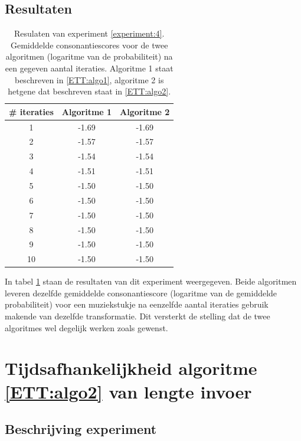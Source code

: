 \subsection{Resultaten}

\begin{table}
  \centering
  \begin{tabular}{c | c | c }    
    \# iteraties & Algoritme 1 & Algoritme 2 \\
    \hline
    1 & -1.69 & -1.69\\
    2 & -1.57 & -1.57\\
    3 & -1.54 & -1.54\\
    4 & -1.51 & -1.51\\
    5 & -1.50 & -1.50\\
    6 & -1.50 & -1.50\\
    7 & -1.50 & -1.50\\
    8 & -1.50 & -1.50\\
    9 & -1.50 & -1.50\\
    10 & -1.50 & -1.50\\
  \end{tabular}
  \caption{Resulaten van experiment \ref{experiment:4}. Gemiddelde consonantiescores voor de twee algoritmen (logaritme van de probabiliteit) na een gegeven aantal iteraties. Algoritme 1 staat beschreven in \ref{ETT:algo1}, algoritme 2 is hetgene dat beschreven staat in \ref{ETT:algo2}.}
  \label{tabel:res4}
\end{table}

In tabel \ref{tabel:res4} staan de resultaten van dit experiment weergegeven. Beide algoritmen leveren dezelfde gemiddelde consonantiescore (logaritme van de gemiddelde probabiliteit) voor een muziekstukje na eenzelfde aantal iteraties gebruik makende van dezelfde transformatie. Dit versterkt de stelling dat de twee algoritmes wel degelijk werken zoals gewenst.

\section{Tijdsafhankelijkheid algoritme \ref{ETT:algo2} van lengte invoer}
\label{experiment:7}
\subsection{Beschrijving experiment}

